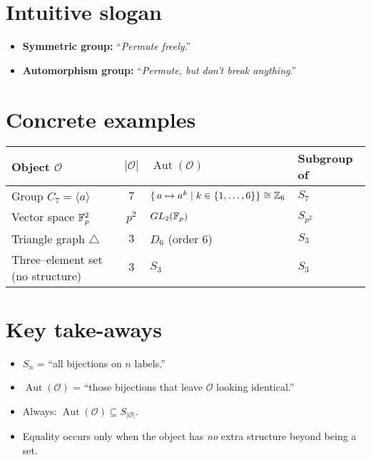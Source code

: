 \documentclass[12pt]{article}
\DeclareMathOperator{\Aut}{Aut}
\theoremstyle{definition} %
\theoremstyle{plain} %
\begin{document}
\bigskip
\section*{Intuitive slogan}

\begin{itemize}
  \item \textbf{Symmetric group:} “\emph{Permute freely}.”
  \item \textbf{Automorphism group:} “\emph{Permute, but don’t break anything}.”
\end{itemize}

\bigskip
\section*{Concrete examples}

\begin{center}
\renewcommand{\arraystretch}{1.2}
\begin{tabular}{|l|c|l|l|}
\hline
\textbf{Object $\mathcal O$} & $|\mathcal O|$ &
$\displaystyle\Aut(\mathcal O)$ & Subgroup of \\ \hline
Group $C_{7}=\langle a\rangle$ & $7$ &
$\{\,a\mapsto a^{k}\mid k\in\{1,\dots ,6\}\}\cong\Bbb Z_{6}$ & $S_{7}$ \\ 
Vector space $\Bbb F_{p}^{2}$   & $p^{2}$ &
$GL_{2}(\Bbb F_{p})$ & $S_{p^{2}}$ \\ 
Triangle graph $\triangle$      & $3$ &
$D_{6}$ (order $6$) & $S_{3}$ \\ 
Three–element set (no structure) & $3$ &
$S_{3}$ & $S_{3}$ \\ \hline
\end{tabular}
\end{center}

\bigskip
\section*{Key take-aways}

\begin{itemize}
  \item $S_{n}$ = “all bijections on $n$ labels.”
  \item $\Aut(\mathcal O)$ = “those bijections that leave $\mathcal O$
        looking identical.”
  \item Always: $\displaystyle\Aut(\mathcal O)\subseteq S_{|\mathcal O|}$.
  \item Equality occurs only when the object has \emph{no} extra
        structure beyond being a set.
\end{itemize}
\end{document}
